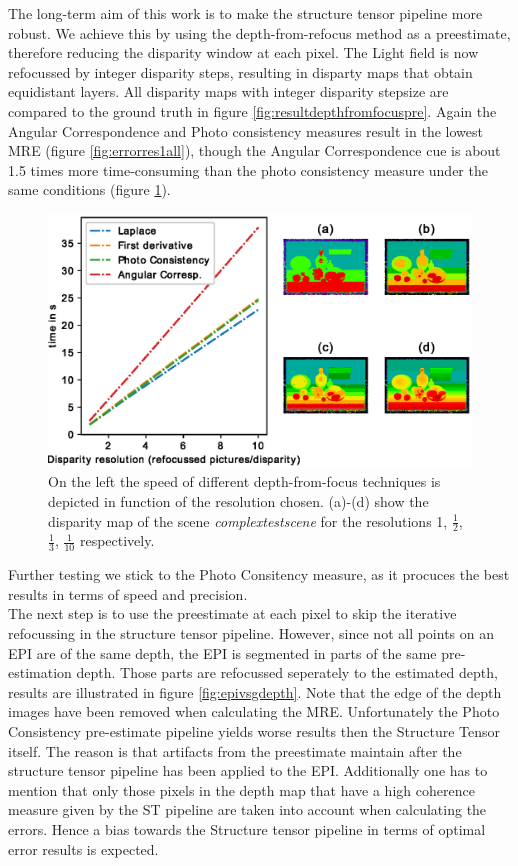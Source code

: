 \documentclass  [
  paper    = a4,
  BCOR     = 10mm,
  twoside,
  fontsize = 12pt,
  fleqn,
  toc      = bibnumbered,
  toc      = listofnumbered,
  numbers  = noendperiod,
  headings = normal,
  listof   = leveldown,
  version  = 3.03
]                                       {scrreprt}
\begin{document}
	
	The long-term aim of this work is to make the structure tensor pipeline more robust. We achieve this by using the depth-from-refocus method as a preestimate, therefore reducing the disparity window at each pixel. The Light field is now refocussed by integer disparity steps, resulting in disparty maps that obtain equidistant layers.
	 All disparity maps with integer disparity stepsize are compared to the ground truth in figure \ref{fig:resultdepthfromfocuspre}. Again the Angular Correspondence and Photo consistency measures result in the lowest MRE (figure \ref{fig:errorres1all}), though the Angular Correspondence cue is about 1.5 times more time-consuming than the photo consistency measure under the same conditions (figure \ref{fig:speeds}).
	 \begin{figure}
	 	\centering
	 	\includegraphics[width=0.7\linewidth]{images/speeds.eps}
	 	\caption[Speed of different depth-from-focus techniques]{ On the left the speed of different depth-from-focus techniques is depicted in function of the resolution chosen. (a)-(d) show the disparity map of the scene \textit{complextestscene} for the resolutions 1, $\frac{1}{2}$, $\frac{1}{3}$, $\frac{1}{10}$ respectively.}
	 	\label{fig:speeds}
	 \end{figure}
 	Further testing we stick to the Photo Consitency measure, as it procuces the best results in terms of speed and precision.\\
 	The next step is to use the preestimate at each pixel to skip the iterative refocussing in the structure tensor pipeline. However, since not all points on an EPI are of the same depth, the EPI is segmented in parts of the same pre-estimation depth. Those parts are refocussed seperately to the estimated depth, results are illustrated in figure \ref{fig:epivsgdepth}. Note that the edge of the depth images have been removed when calculating the MRE. 
 	Unfortunately the Photo Consistency pre-estimate pipeline yields worse results then the Structure Tensor itself. The reason is that artifacts from the preestimate maintain after the structure tensor pipeline has been applied to the EPI. Additionally one has to mention that only those pixels in the depth map that have a high coherence measure given by the ST pipeline are taken into account when calculating the errors. Hence a bias towards the Structure tensor pipeline in terms of optimal error results is expected. \\
\end{document}
